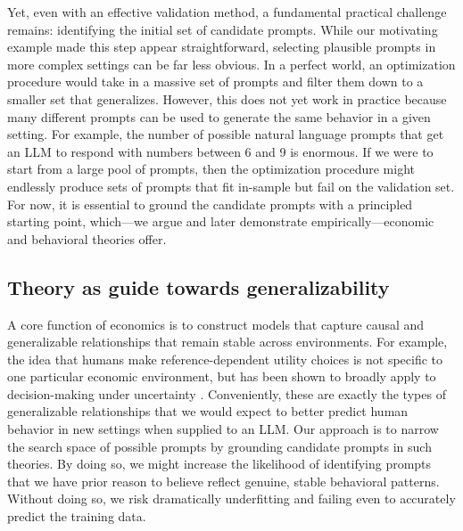 \documentclass[11pt]{article}
\theoremstyle{definition}
\newcommand{\persona}{prompt}
\begin{document}
Yet, even with an effective validation method, a fundamental practical challenge remains: identifying the initial set of candidate \persona{s}. 
While our motivating example made this step appear straightforward, selecting plausible \persona{s} in more complex settings can be far less obvious.
In a perfect world, an optimization procedure would take in a massive set of prompts and filter them down to a smaller set that generalizes.
However, this does not yet work in practice because many different prompts can be used to generate the same behavior in a given setting.
For example, the number of possible natural language prompts that get an LLM to respond with numbers between 6 and 9 is enormous.
If we were to start from a large pool of prompts, then the optimization procedure might endlessly produce sets of \persona{s} that fit in-sample but fail on the validation set.
For now, it is essential to ground the candidate \persona{s} with a principled starting point, which---we argue and later demonstrate empirically---economic and behavioral theories offer.

\subsection{Theory as guide towards generalizability}

A core function of economics is to construct models that capture causal and generalizable relationships that remain stable across environments.
For example, the idea that humans make reference-dependent utility choices is not specific to one particular economic environment, but has been shown to broadly apply to decision-making under uncertainty \citep{prospectkahneman1979}.
Conveniently, these are exactly the types of generalizable relationships that we would expect to better predict human behavior in new settings when supplied to an LLM.
Our approach is to narrow the search space of possible \persona{s} by grounding candidate \persona{s} in such theories.
By doing so, we might increase the likelihood of identifying \persona{s} that we have prior reason to believe reflect genuine, stable behavioral patterns.
Without doing so, we risk dramatically underfitting and failing even to accurately predict the training data.
\end{document}
